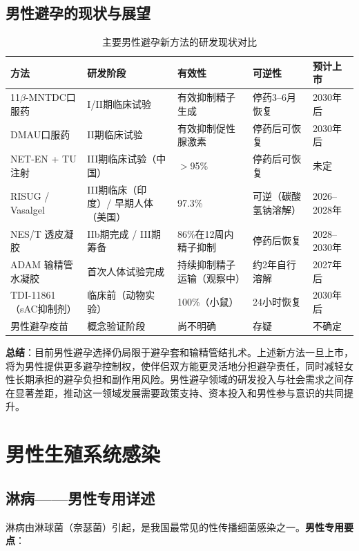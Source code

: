 \subsection{男性避孕的现状与展望}

\begin{table}[htbp]
\centering
\caption{主要男性避孕新方法的研发现状对比}
\label{tab:male_contraception_new}
\begin{tabularx}{\textwidth}{@{}lXXXX@{}}
    \toprule
    \textbf{方法} & \textbf{研发阶段} & \textbf{有效性} & \textbf{可逆性} & \textbf{预计上市} \\
    \midrule
    11$\beta$-MNTDC口服药 & I/II期临床试验 & 有效抑制精子生成 & 停药3--6月恢复 & 2030年后 \\
    DMAU口服药 & II期临床试验 & 有效抑制促性腺激素 & 停药后可恢复 & 2030年后 \\
    NET-EN + TU注射 & III期临床试验（中国） & $>$95\% & 停药后可恢复 & 未定 \\
    RISUG / Vasalgel & III期临床（印度）/ 早期人体（美国） & 97.3\% & 可逆（碳酸氢钠溶解） & 2026--2028年 \\
    NES/T 透皮凝胶 & IIb期完成 / III期筹备 & 86\%在12周内精子抑制 & 停药后恢复 & 2028--2030年 \\
    ADAM 输精管水凝胶 & 首次人体试验完成 & 持续抑制精子运输（观察中） & 约2年自行溶解 & 2027年后 \\
    TDI-11861（sAC抑制剂） & 临床前（动物实验） & 100\%（小鼠） & 24小时恢复 & 2030年后 \\
    男性避孕疫苗 & 概念验证阶段 & 尚不明确 & 存疑 & 不确定 \\
    \bottomrule
\end{tabularx}
\end{table}

\noindent\textbf{总结}：目前男性避孕选择仍局限于避孕套和输精管结扎术。上述新方法一旦上市，将为男性提供更多避孕控制权，使伴侣双方能更灵活地分担避孕责任，同时减轻女性长期承担的避孕负担和副作用风险。男性避孕领域的研发投入与社会需求之间存在显著差距，推动这一领域发展需要政策支持、资本投入和男性参与意识的共同提升。

\section{男性生殖系统感染}
\subsection{淋病——男性专用详述}


淋病由淋球菌（奈瑟菌）引起，是我国最常见的性传播细菌感染之一。\textbf{男性专用要点}：

